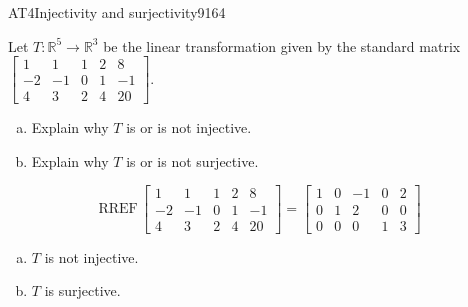 \begin{exercise}{AT4}{Injectivity and surjectivity}{9164} 
\begin{exerciseStatement} 

 Let \(T:\mathbb{R}^5 \to \mathbb{R}^3\) be the linear transformation given by the standard matrix \(\left[\begin{array}{ccccc}
1 & 1 & 1 & 2 & 8 \\
-2 & -1 & 0 & 1 & -1 \\
4 & 3 & 2 & 4 & 20
\end{array}\right]\). 

 

\begin{enumerate}[(a)]
\item 

Explain why \(T\) is or is not injective.


\item 

Explain why \(T\) is or is not surjective.


\end{enumerate}

     \end{exerciseStatement}
 \begin{exerciseAnswer} 

\[\mathrm{RREF}\,\left[\begin{array}{ccccc}
1 & 1 & 1 & 2 & 8 \\
-2 & -1 & 0 & 1 & -1 \\
4 & 3 & 2 & 4 & 20
\end{array}\right]=\left[\begin{array}{ccccc}
1 & 0 & -1 & 0 & 2 \\
0 & 1 & 2 & 0 & 0 \\
0 & 0 & 0 & 1 & 3
\end{array}\right]\]

 

\begin{enumerate}[(a)]
\item  

\(T\) is not injective.

 
\item  

\(T\) is surjective.

 
\end{enumerate}

     \end{exerciseAnswer}
 \end{exercise}



